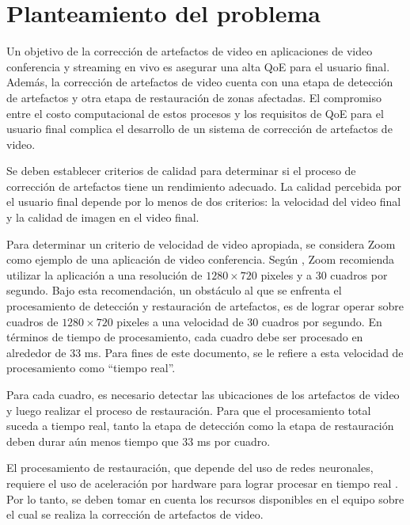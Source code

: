 
\chapter{Planteamiento del problema}
\label{chp:planteamiento}

Un objetivo de la corrección de artefactos de video en aplicaciones de video conferencia y streaming en vivo es asegurar una alta QoE para el usuario final. Además, la corrección de artefactos de video cuenta con una etapa de detección de artefactos y otra etapa de restauración de zonas afectadas. El compromiso entre el costo computacional de estos procesos y los requisitos de QoE para el usuario final complica el desarrollo de un sistema de corrección de artefactos de video.

Se deben establecer criterios de calidad para determinar si el proceso de corrección de artefactos tiene un rendimiento adecuado. La calidad percebida por el usuario final depende por lo menos de dos criterios: la velocidad del video final y la calidad de imagen en el video final.

Para determinar un criterio de velocidad de video apropiada, se considera Zoom como ejemplo de una aplicación de video conferencia. Según \cite{ZoomSupport}, Zoom recomienda utilizar la aplicación a una resolución de $1280 \times 720$ pixeles y a 30 cuadros por segundo. Bajo esta recomendación, un obstáculo al que se enfrenta el procesamiento de detección y restauración de artefactos, es de lograr operar sobre cuadros de $1280 \times 720$ pixeles a una velocidad de 30 cuadros por segundo. En términos de tiempo de procesamiento, cada cuadro debe ser procesado en alrededor de 33 ms. Para fines de este documento, se le refiere a esta velocidad de procesamiento como ``tiempo real''.

Para cada cuadro, es necesario detectar las ubicaciones de los artefactos de video y luego realizar el proceso de restauración. Para que el procesamiento total suceda a tiempo real, tanto la etapa de detección como la etapa de restauración deben durar aún menos tiempo que 33 ms por cuadro.

El procesamiento de restauración, que depende del uso de redes neuronales, requiere el uso de aceleración por hardware para lograr procesar en tiempo real \cite{Li2022}. Por lo tanto, se deben tomar en cuenta los recursos disponibles en el equipo sobre el cual se realiza la corrección de artefactos de video.


